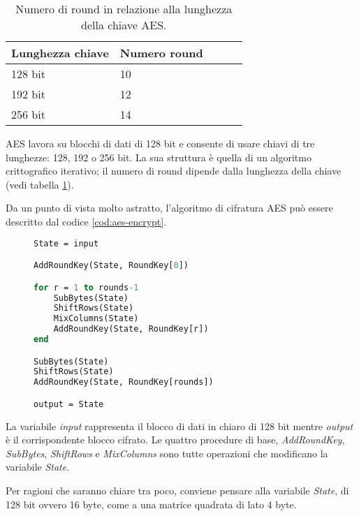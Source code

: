 \documentclass[12pt,a4paper,oneside]{book}
\begin{document}
\begin{table}[h]
\begin{center}
\begin{tabular}{|l|l|l|l|l|}
\hline
\textbf{Lunghezza chiave} &  \textbf{Numero round} \\
\hline
128 bit & 10 \\
\hline
192 bit & 12 \\
\hline
256 bit & 14 \\
\hline
\end{tabular}
\caption{Numero di round in relazione alla lunghezza della chiave \ac{AES}.\label{tab:aes-rounds}}
\end{center}
\end{table}

\ac{AES} lavora su blocchi di dati di 128 bit e consente di usare chiavi di tre lunghezze: 128, 192 o 256 bit. La sua struttura è quella di un algoritmo crittografico iterativo; il numero di round dipende dalla lunghezza della chiave (vedi tabella \ref{tab:aes-rounds}).

Da un punto di vista molto astratto, l'algoritmo di cifratura \ac{AES} può essere descritto dal codice \ref{cod:aes-encrypt}.

\vspace*{10pt}
\begin{figure}
\begin{lstlisting}[caption=\textit{Procedura di cifratura AES.},label={cod:aes-encrypt},language=Pascal]
State = input

AddRoundKey(State, RoundKey[0])

for r = 1 to rounds-1
	SubBytes(State)
	ShiftRows(State)
	MixColumns(State)
	AddRoundKey(State, RoundKey[r])
end

SubBytes(State)
ShiftRows(State)
AddRoundKey(State, RoundKey[rounds])

output = State
\end{lstlisting}
\end{figure}

La variabile \textit{input} rappresenta il blocco di dati in chiaro di 128 bit mentre \textit{output} è il corrispondente blocco cifrato. Le quattro procedure di base, \textit{AddRoundKey}, \textit{SubBytes}, \textit{ShiftRows} e \textit{MixColumns} sono tutte operazioni che modificano la variabile \textit{State}.

Per ragioni che saranno chiare tra poco, conviene pensare alla variabile \textit{State}, di 128 bit ovvero 16 byte, come a una matrice quadrata di lato 4 byte.
\end{document}
